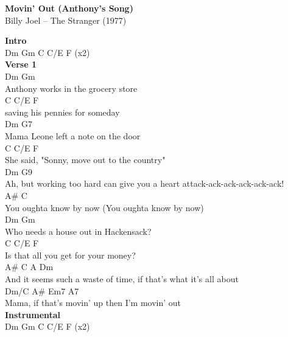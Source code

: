 \documentclass[a4paper]{article}
\begin{document}
    \begin{center}
        \textbf{Movin' Out (Anthony's Song)}
        ~\\
        Billy Joel -- The Stranger (1977)
    \end{center}
    {
        \scriptsize
        \textbf{Intro}
        ~\\
        {
            \cutive
            \obeyspaces
Dm  Gm  C C/E F  (x2)
\\

        }
        \textbf{Verse 1}
        ~\\
        {
            \cutive
            \obeyspaces
Dm                    Gm
\\
Anthony works in the grocery store
\\
C             C/E         F
\\
saving his pennies for someday
\\
Dm                 G7
\\
Mama Leone left a note on the door
\\
           C           C/E        F
\\
She said, "Sonny, move out to the country"
\\
        Dm                              G9
\\
Ah, but working too hard can give you a heart attack-ack-ack-ack-ack-ack!
\\
A\#                  C
\\
You oughta know by now (You oughta know by now)
\\
Dm                        Gm
\\
Who needs a house out in Hackensack?
\\
   C          C/E             F
\\
Is that all you get for your money?
\\
       A\#                    C        A                    Dm
\\
And it seems such a waste of time, if that's what it's all about
\\
Dm/C         A\#                Em7  A7
\\
Mama, if that's movin' up then I'm       movin' out
\\

        }
        \textbf{Instrumental}
        ~\\
        {
            \cutive
            \obeyspaces
Dm  Gm  C C/E F  (x2)
\\

}}
\end{document}
